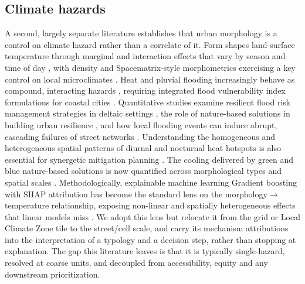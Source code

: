 \subsection{Climate hazards}
\label{sec:bg-hazard}
A second, largely separate literature establishes that urban morphology is a
control on climate hazard rather than a correlate of it. Form shapes land-surface
temperature through marginal and interaction effects that vary by season and time
of day \citep{wangZ2025MarginalInteraction}, with density and Spacematrix-style
morphometrics exercising a key control on local microclimates \citep{li2020InfluencDensity}.
Heat and pluvial flooding increasingly behave as compound, interacting
hazards \citep{imroz2025IntegratedAssess}, requiring integrated flood vulnerability
index formulations for coastal cities \citep{balica2012FloodVulnerab}. Quantitative
studies examine resilient flood risk management strategies in deltaic settings
\citep{chan2018TowardsResilien}, the role of nature-based solutions in building
urban resilience \citep{bush2019BuildingUrban}, and how local flooding events can
induce abrupt, cascading failures of street networks \citep{wang2019LocalFloods}.
Understanding the homogeneous and heterogeneous spatial patterns of diurnal and
nocturnal heat hotspots is also essential for synergetic mitigation planning
\citep{liu2025HomogeneHeteroge}. The cooling delivered by green and blue
nature-based solutions is now quantified across morphological types and spatial
scales \citep{wei2025NatureBased}. Methodologically, explainable machine learning
Gradient boosting with SHAP attribution has become the standard lens on the
morphology$\rightarrow$temperature relationship, exposing non-linear and
spatially heterogeneous effects that linear models miss
\citep{wangZ2025PlainPlateau, liu2026Nonlinear, li2026BlockGrid}. We adopt this
lens but relocate it from the grid or Local Climate Zone tile
\citep{stewart2012LocalClimate} to the street/cell scale, and carry its mechanism attributions into the interpretation of a typology and a
decision step, rather than stopping at explanation. The gap this literature leaves is that it is
typically single-hazard, resolved at coarse units, and decoupled from
accessibility, equity and any downstream prioritization.

